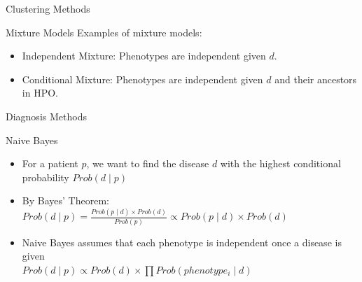 \documentclass[final]{beamer} %
\begin{document}
\begin{frame}{}
\begin{columns}[T]
\begin{column}{0.3\linewidth}
{\begin{block}{\Huge Clustering Methods}
\begin{block}{\Large Mixture Models}
       Examples of mixture models:
       \begin{itemize}
       \item Independent Mixture: Phenotypes are independent given $d$.
       \item Conditional Mixture: Phenotypes are independent given $d$ and
         their ancestors in HPO.
       \end{itemize}
     \end{block}
   \end{block}
   \vfill

   \begin{block}{\Huge Diagnosis Methods}
   
     \begin{block}{\Large Naive Bayes}
       \begin{itemize}
         \Large
       \item For a patient $p$, we want to find the disease $d$ with
         the highest conditional probability $Prob(d \mid p )$
         \vspace{1cm}
       \item
         By Bayes' Theorem: \\
         $Prob(d \mid p) = \frac{Prob(p \mid d) \times
           Prob(d)}{Prob(p)} \propto Prob(p \mid d) \times Prob(d)$
         \vspace{1cm}
       \item
         Naive Bayes assumes that each phenotype is independent once a disease is given \\
         $Prob(d \mid p) \propto Prob(d) \times \prod Prob(phenotype_i
         \mid d)$
       \end{itemize}
     \end{block}
     \vspace{1cm}


\end{block}}
\end{column}
\end{columns}
\end{frame}
\end{document}
